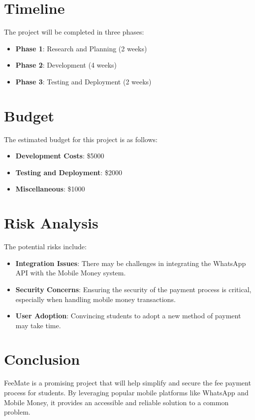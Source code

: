 \documentclass[a4paper,12pt]{article}
\begin{document}
\section*{Timeline}
The project will be completed in three phases:
\begin{itemize}
    \item \textbf{Phase 1}: Research and Planning (2 weeks)
    \item \textbf{Phase 2}: Development (4 weeks)
    \item \textbf{Phase 3}: Testing and Deployment (2 weeks)
\end{itemize}

\section*{Budget}
The estimated budget for this project is as follows:
\begin{itemize}
    \item \textbf{Development Costs}: \$5000
    \item \textbf{Testing and Deployment}: \$2000
    \item \textbf{Miscellaneous}: \$1000
\end{itemize}

\section*{Risk Analysis}
The potential risks include:
\begin{itemize}
    \item \textbf{Integration Issues}: There may be challenges in integrating the WhatsApp API with the Mobile Money system.
    \item \textbf{Security Concerns}: Ensuring the security of the payment process is critical, especially when handling mobile money transactions.
    \item \textbf{User Adoption}: Convincing students to adopt a new method of payment may take time.
\end{itemize}

\section*{Conclusion}
FeeMate is a promising project that will help simplify and secure the fee payment process for students. By leveraging popular mobile platforms like WhatsApp and Mobile Money, it provides an accessible and reliable solution to a common problem.
\end{document}
